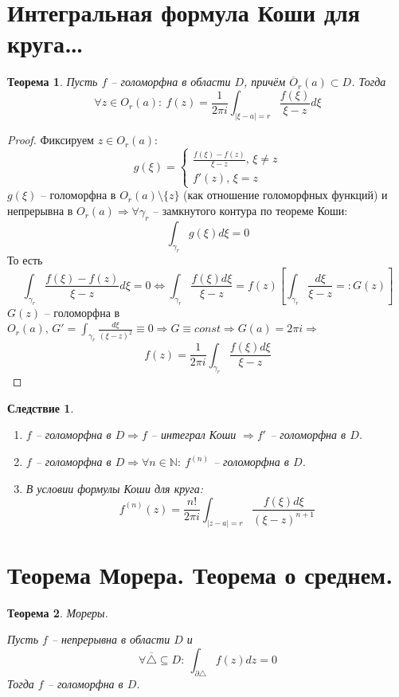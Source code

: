 \documentclass[a4paper,12pt]{article}
\theoremstyle{plain}
\newtheorem{theorem}{Теорема}[section]
\newtheorem*{corollary}{Следствие}
\theoremstyle{definition}
\theoremstyle{remark}
\begin{document}
\section{Интегральная формула Коши для круга\dots}
\begin{theorem}
	Пусть $f$ -- голоморфна в области $D$, причём $\overline{O}_r(a) \subset D$. Тогда
	\[
		\forall z \in O_r(a) :\: f(z) = \frac{1}{2\pi i} \int_{\vert \xi - a\vert = r}\frac{f(\xi)}{\xi - z}d\xi
	\]
\end{theorem}

\begin{proof}
	Фиксируем $z \in O_r(a)$:
	\[
		g(\xi) = \begin{cases}
			\frac{f(\xi) - f(z)}{\xi - z},\, \xi \neq z \\
			f'(z),\, \xi = z
		\end{cases}
	\]
	$g(\xi)$ -- голоморфна в $O_r(a) \setminus \{z\}$ (как отношение голоморфных функций) и непрерывна в $O_r(a) \Rightarrow \forall \gamma_r$ -- замкнутого контура по теореме Коши:
	\[
		\int_{\gamma_r}g(\xi)d\xi = 0
	\]
	То есть
	\[
		\int_{\gamma_r}\frac{f(\xi) - f(z)}{\xi - z}d\xi = 0 \Leftrightarrow
		\int_{\gamma_r}\frac{f(\xi)d\xi}{\xi - z} = f(z)\left[\int_{\gamma_r}\frac{d\xi}{\xi - z} =: G(z)\right]
	\]
	$G(z)$ -- голоморфна в $O_r(a),\, G' = \int_{\gamma_r} \frac{d\xi}{(\xi - z)^2} \equiv 0 \Rightarrow G \equiv const \Rightarrow G(a) = 2\pi i \Rightarrow$
	\[
		f(z) = \frac{1}{2\pi i} \int_{\gamma_r}\frac{f(\xi)d\xi}{\xi - z}
	\]
\end{proof}

\begin{corollary}
	\begin{enumerate}
		\item $f$ -- голоморфна в $D \Rightarrow f$ -- интеграл Коши $\Rightarrow f'$ -- голоморфна в $D$.
		\item $f$ -- голоморфна в $D \Rightarrow \forall n \in \mathbb{N} :\: f^{(n)}$ -- голоморфна в $D$.
		\item В условии формулы Коши для круга:
		      \begin{equation}\label{nElem}
			      f^{(n)}(z) = \frac{n!}{2\pi i} \int_{\vert z - a\vert = r} \frac{f(\xi)d\xi}{(\xi - z)^{n + 1}}
		      \end{equation}
	\end{enumerate}
\end{corollary}

\section{Теорема Морера. Теорема о среднем.}
\begin{theorem}
	Мореры.

	Пусть $f$ -- непрерывна в области $D$ и
	\[
		\forall \overline{\triangle} \subseteq D :\: \int_{\partial \triangle} f(z)dz = 0
	\]
	Тогда $f$ -- голоморфна в $D$.
\end{theorem}
\end{document}
